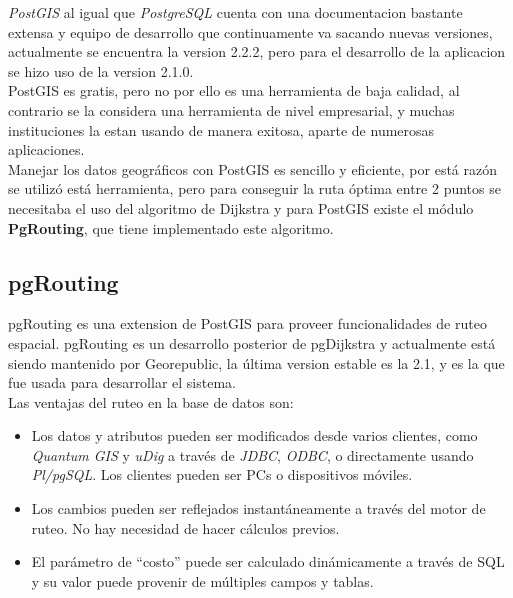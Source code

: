       \emph{PostGIS} al igual que \emph{PostgreSQL} cuenta con una documentacion bastante extensa y equipo de desarrollo que continuamente va sacando nuevas versiones, actualmente se encuentra la version 2.2.2, pero para el desarrollo de la aplicacion se hizo uso de la version 2.1.0.\\

      PostGIS es gratis, pero no por ello es una herramienta de baja calidad, al contrario se la considera una herramienta de nivel empresarial, y muchas instituciones la estan usando de manera exitosa, aparte de numerosas aplicaciones.\\

      Manejar los datos geográficos con PostGIS es sencillo y eficiente, por está raz\'on se utilizó está herramienta, pero para conseguir la ruta óptima entre 2 puntos se necesitaba el uso del algoritmo de Dijkstra y para PostGIS existe el módulo \textbf{PgRouting}, que tiene implementado este algoritmo.\\

      \subsection{pgRouting} %
      \label{sec:pgrouting}
        pgRouting es una extension  de  PostGIS para proveer funcionalidades de ruteo espacial. pgRouting es un desarrollo posterior de pgDijkstra y actualmente está siendo mantenido por Georepublic, la última version estable es la 2.1, y es la que fue usada para desarrollar el sistema.\\

        Las ventajas del ruteo en la base de datos son:
        \begin{itemize}
          \item Los datos y atributos pueden ser modificados desde varios clientes, como \emph{Quantum GIS} y \emph{uDig} a través de \emph{JDBC}, \emph{ODBC}, o directamente usando \emph{Pl/pgSQL}. Los clientes pueden ser PCs o dispositivos móviles.
          \item Los cambios pueden ser reflejados instantáneamente a través del motor de ruteo. No hay necesidad de hacer cálculos previos.
          \item El parámetro de ``costo'' puede ser calculado dinámicamente a través de SQL y su valor puede provenir de múltiples campos y tablas.
        \end{itemize}

